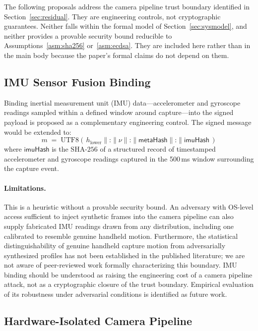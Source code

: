 \documentclass[11pt,a4paper]{article}
\newcommand{\SHA}{\text{SHA-256}}
\begin{document}
The following proposals address the camera pipeline trust boundary identified in
Section~\ref{sec:residual}.  They are engineering controls, not cryptographic
guarantees.  Neither falls within the formal model of
Section~\ref{sec:sysmodel}, and neither provides a provable security bound
reducible to Assumptions~\ref{asm:sha256} or~\ref{asm:ecdsa}.  They are
included here rather than in the main body because the paper's formal claims do
not depend on them.

\subsection{IMU Sensor Fusion Binding}
\label{app:imu}

Binding inertial measurement unit (IMU) data---accelerometer and gyroscope
readings sampled within a defined window around capture---into the signed
payload is proposed as a complementary engineering control.  The signed message
would be extended to:
\[
  m \;=\; \mathrm{UTF8}\!\left(\,h_{\mathrm{lower}} \mathbin\| \texttt{:}
    \mathbin\| \nu \mathbin\| \texttt{:} \mathbin\| \mathsf{metaHash}
    \mathbin\| \texttt{:} \mathbin\| \mathsf{imuHash}\,\right)
\]
where $\mathsf{imuHash}$ is the $\SHA$ of a structured record of timestamped
accelerometer and gyroscope readings captured in the 500\,ms window surrounding
the capture event.

\paragraph{Limitations.} This is a heuristic without a provable security bound.
An adversary with OS-level access sufficient to inject synthetic frames into the
camera pipeline can also supply fabricated IMU readings drawn from any
distribution, including one calibrated to resemble genuine handheld motion.
Furthermore, the statistical distinguishability of genuine handheld capture
motion from adversarially synthesized profiles has not been established in the
published literature; we are not aware of peer-reviewed work formally
characterizing this boundary.  IMU binding should be understood as raising the
engineering cost of a camera pipeline attack, not as a cryptographic closure of
the trust boundary.  Empirical evaluation of its robustness under adversarial
conditions is identified as future work.

\subsection{Hardware-Isolated Camera Pipeline}
\label{app:isp}
\end{document}
